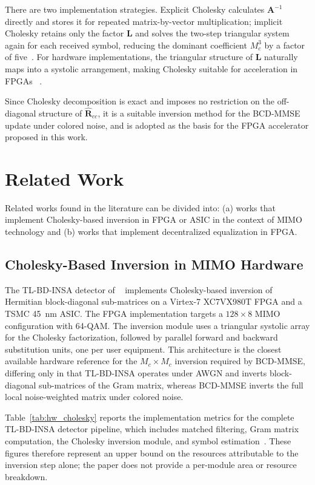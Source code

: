 \documentclass[12pt]{article}
\begin{document}
There are two implementation strategies. Explicit Cholesky calculates $\mathbf{A}^{-1}$ directly and stores it for repeated matrix-by-vector multiplication;
implicit Cholesky retains only the factor $\mathbf{L}$
and solves the two-step triangular system again for each received symbol,
reducing the dominant coefficient $M_c^3$ by a factor of
five~\cite{li-tradeofs}. For hardware implementations, the triangular structure of $\mathbf{L}$ naturally maps into a systolic arrangement,
making Cholesky suitable for acceleration in FPGAs
~\cite{wang2023bdnsepa}.

Since Cholesky decomposition is exact and imposes no restriction on the
off-diagonal structure of $\hat{\mathbf{R}}_{cc}$, it is a suitable
inversion method for the BCD-MMSE update under colored noise, and is
adopted as the basis for the FPGA accelerator proposed in this work.

\section{Related Work}
\label{sec:relatedwork}
Related works found in the literature can be divided into: (a) works that implement Cholesky-based inversion in FPGA or ASIC in the context of MIMO technology and (b) works that implement decentralized equalization in FPGA.

\subsection{Cholesky-Based Inversion in MIMO Hardware}
The TL-BD-INSA detector of ~\cite{wang2021tlbdinsa}  implements Cholesky-based inversion
of Hermitian block-diagonal sub-matrices on a Virtex-7 XC7VX980T FPGA
and a TSMC 45~nm ASIC. The FPGA implementation targets a $128 \times 8$ MIMO configuration with 64-QAM. The
inversion module uses a triangular systolic array for the Cholesky
factorization, followed by parallel forward and backward substitution
units, one per user equipment. This architecture is the closest available
hardware reference for the $M_c \times M_c$ inversion required by
BCD-MMSE, differing only in that TL-BD-INSA operates under AWGN and
inverts block-diagonal sub-matrices of the Gram matrix, whereas BCD-MMSE
inverts the full local noise-weighted matrix under colored noise.

Table~\ref{tab:hw_cholesky} reports the implementation metrics for the
complete TL-BD-INSA detector pipeline, which includes matched filtering,
Gram matrix computation, the Cholesky inversion module, and symbol
estimation~\cite{wang2021tlbdinsa}. These figures therefore represent
an upper bound on the resources attributable to the inversion step alone;
the paper does not provide a per-module area or resource breakdown.
\end{document}
